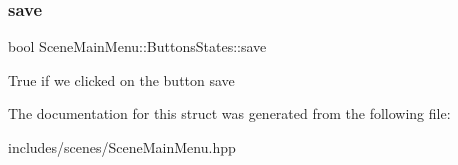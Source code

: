 \subsubsection{\texorpdfstring{save}{save}}
{\footnotesize\ttfamily bool Scene\+Main\+Menu\+::\+Buttons\+States\+::save}

True if we clicked on the button save 

The documentation for this struct was generated from the following file\+:\begin{DoxyCompactItemize}
\item 
includes/scenes/Scene\+Main\+Menu.\+hpp\end{DoxyCompactItemize}
